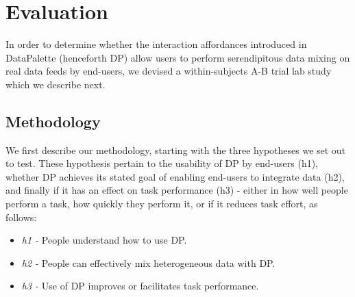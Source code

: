 \documentclass{sigchi}
\begin{document}
\section{Evaluation}

In order to determine whether the interaction affordances introduced in DataPalette (henceforth DP) allow users to perform serendipitous data mixing on real data feeds by end-users, we devised a within-subjects A-B trial lab study which we describe next.

\subsection{Methodology}

We first describe our methodology, starting with the three hypotheses we set out to test. These hypothesis pertain to the usability of DP by end-users (h1), whether DP achieves its stated goal of enabling end-users to integrate data (h2), and finally if it has an effect on task performance (h3) - either in how well people perform a task, how quickly they perform it, or if it reduces task effort, as follows:




\begin{itemize}
\item \emph{h1 -} People understand how to use DP.
\item \emph{h2 -} People can effectively mix heterogeneous data with DP.
\item \emph{h3 -} Use of DP improves or facilitates task performance.
\end{itemize}
\end{document}

